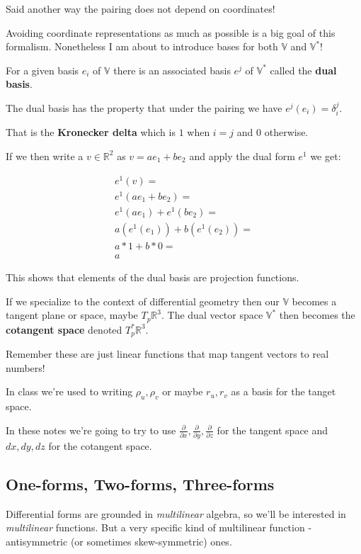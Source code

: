 \documentclass{article}
\theoremstyle{definition}
\begin{document}
Said another way the pairing does not depend on coordinates!

Avoiding coordinate representations as much as possible is a big goal of this
formalism. Nonetheless I am about to introduce bases for both $\mathbb{V}$ and $\mathbb{V}^{*}$!

For a given basis $e_{i}$ of $\mathbb{V}$ there is an associated basis $e^{j}$
of $\mathbb{V}^{*}$ called the \textbf{dual basis}.

The dual basis has the property that under the pairing we have $e^{j}(e_{i}) = \delta^{j}_{i}$.

That is the \textbf{Kronecker delta} which is $1$ when $i = j$ and $0$
otherwise.

If we then write a $v \in \mathbb{R}^{2}$ as $v = ae_{1} + be_{2}$ and apply the
dual form $e^{1}$ we get:

\begin{align*}
  e^{1} (v) = \\
  e^{1}(ae_{1} + be_{2}) = \\
  e^{1}(ae_{1}) + e^{1}(be_{2}) = \\
  a(e^{1}(e_{1})) + b(e^{1}(e_{2})) = \\
  a * 1 + b * 0 = \\
  a
\end{align*}

This shows that elements of the dual basis are projection functions.

If we specialize to the context of differential geometry then our $\mathbb{V}$
becomes a tangent plane or space, maybe $T_{p}\mathbb{R}^{3}$. The dual vector space $\mathbb{V}^{*}$ then becomes the \textbf{cotangent space}
denoted $T_{p}^{*}\mathbb{R}^{3}$.

Remember these are just linear functions that
map tangent vectors to real numbers!

In class we're used to writing $\rho_{u}, \rho_{v}$ or maybe $r_{u}, r_{v}$ as a
basis for the tanget space.

In these notes we're going to try to use $\frac{\partial}{\partial x}, \frac{\partial}{\partial
  y}, \frac{\partial}{\partial z}$ for the tangent space and $dx, dy, dz$ for the cotangent space.

\subsection{One-forms, Two-forms, Three-forms}

Differential forms are grounded in \textit{multilinear} algebra, so we'll be
interested in \textit{multilinear} functions. But a very specific kind of
multilinear function - antisymmetric (or sometimes skew-symmetric) ones.
\end{document}
